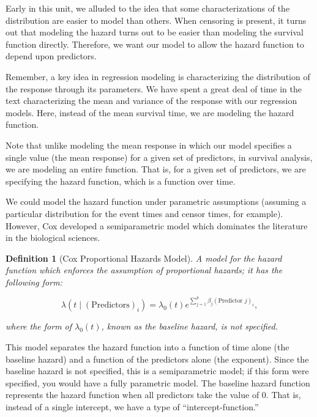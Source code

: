 \documentclass[
]{book}
\theoremstyle{plain}
\theoremstyle{mydefn}
\newtheorem{definition}{Definition}[chapter]
\theoremstyle{myexmpl}
\theoremstyle{remark}
\begin{document}
Early in this unit, we alluded to the idea that some characterizations of the distribution are easier to model than others. When censoring is present, it turns out that modeling the hazard turns out to be easier than modeling the survival function directly. Therefore, we want our model to allow the hazard function to depend upon predictors.

\begin{rmdtip}
Remember, a key idea in regression modeling is characterizing the distribution of the response through its parameters. We have spent a great deal of time in the text characterizing the mean and variance of the response with our regression models. Here, instead of the mean survival time, we are modeling the hazard function.
\end{rmdtip}

\begin{rmdtip}
Note that unlike modeling the mean response in which our model specifies a single value (the mean response) for a given set of predictors, in survival analysis, we are modeling an entire function. That is, for a given set of predictors, we are specifying the hazard function, which is a function over time.
\end{rmdtip}

We could model the hazard function under parametric assumptions (assuming a particular distribution for the event times and censor times, for example). However, Cox developed a semiparametric model which dominates the literature in the biological sciences.

\begin{definition}[Cox Proportional Hazards Model]
A model for the hazard function which enforces the assumption of proportional hazards; it has the following form:

\[\lambda\left(t \mid (\text{Predictors})_i\right) = \lambda_0(t) e^{\sum\limits_{j=1}^{p} \beta_j (\text{Predictor } j)_i},\]

where the form of \(\lambda_0(t)\), known as the baseline hazard, is not specified.
\end{definition}

This model separates the hazard function into a function of time alone (the baseline hazard) and a function of the predictors alone (the exponent). Since the baseline hazard is not specified, this is a semiparametric model; if this form were specified, you would have a fully parametric model. The baseline hazard function represents the hazard function when all predictors take the value of 0. That is, instead of a single intercept, we have a type of ``intercept-function.''
\end{document}
